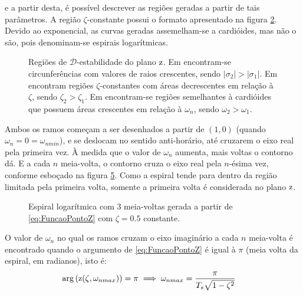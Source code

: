 \noindent e a partir desta, é possível descrever as regiões geradas a partir de tais parâmetros. A região $\zeta$-constante possui o formato apresentado na figura \ref{subfig:MaximoSobressinalZ}. Devido ao exponencial, as curvas geradas assemelham-se a cardióides, mas não o são, pois denominam-se espirais logarítmicas.
\begin{figure}[!ht]
\centering
\begin{subfigure}[t]{0.3\columnwidth}

\caption{}
\label{subfig:EstabilidadeRelativaZ}
\end{subfigure}
\begin{subfigure}[t]{0.3\columnwidth}

\caption{}
\label{subfig:MaximoSobressinalZ}
\end{subfigure}
\begin{subfigure}[t]{0.3\columnwidth}

\caption{}
\label{subfig:OscilacaoNaoAmortecidaZ}
\end{subfigure}
\caption{Regiões de $\mathscr{D}$-estabilidade do plano $\operatorname{\mathrm{z}}$. Em  encontram-se circunferências com valores de raios crescentes, sendo $|\sigma_2| > |\sigma_1|$. Em  encontram regiões $\zeta$-constantes com áreas decrescentes em relação à $\zeta$, sendo $\zeta_2 > \zeta_1$. Em  encontram-se regiões semelhantes à cardióides que possuem áreas crescentes em relação à $\omega_n$, sendo $\omega_2 > \omega_1$.}
\label{fig:RegioesPlanoZ}
\end{figure}

Ambos os ramos começam a ser desenhados a partir de $(1,0)$ (quando $\omega_n = 0 = \omega_{nmin}$), e se deslocam no sentido anti-horário, até cruzarem o eixo real pela primeira vez. À medida que o valor de $\omega_n$ aumenta, mais voltas o contorno dá. E a cada $n$ meia-volta, o contorno cruza o eixo real pela $n$-ésima vez, conforme esboçado na figura \ref{fig:EspiralLogaritmica}. Como a espiral tende para dentro da região limitada pela primeira volta, somente a primeira volta é considerada no plano $\operatorname{\mathrm{z}}$.

\begin{figure}[!ht]
\centering

\caption{Espiral logarítmica com 3 meia-voltas gerada a partir de \eqref{eq:FuncaoPontoZ} com $\zeta=0.5$ constante.}
\label{fig:EspiralLogaritmica}
\end{figure}

O valor de $\omega_n$ no qual os ramos cruzam o eixo imaginário a cada $n$ meia-volta é encontrado quando o argumento de \eqref{eq:FuncaoPontoZ} é igual à $\pi$ (meia volta da espiral, em radianos), isto é:
\begin{align}
\arg{\left(\operatorname{\mathrm{z}}(\zeta,\omega_{nmax})\right)} &= \pi \implies \omega_{nmax} = \dfrac{\pi}{T_s\sqrt{1-\zeta^2}}\label{eq:PontoExtremoZetaZ}
\end{align}

